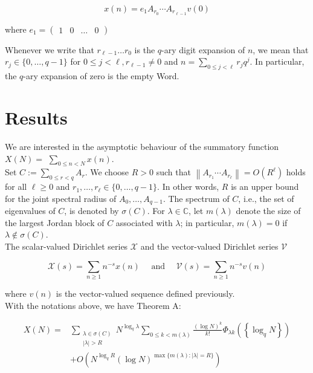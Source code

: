 $$
x(n)=e_{1} A_{r_{0}} \cdots A_{r_{\ell-1}} v(0)
$$

where $e_{1}=\left(\begin{array}{llll}1 & 0 & \ldots & 0\end{array}\right)$

Whenever we write that $r_{\ell-1} \ldots r_{0}$ is the $q$-ary digit expansion of $n$, we mean that $r_{j} \in\{0, \ldots, q-1\}$ for $0 \leq j<\ell, r_{\ell-1} \neq 0$ and $n=\sum_{0 \leq j<\ell} r_{j} q^{j}$. In particular, the $q$-ary expansion of zero is the empty Word.

\newpage
\section{Results}

We are interested in the asymptotic behaviour of the summatory function $X(N)=$ $\sum_{0 \leq n<N} x(n)$.
\\

Set $C:=\sum_{0 \leq r<q} A_{r}$. We choose $R>0$ such that $\left\|A_{r_{1}} \cdots A_{r_{\ell}}\right\|=O\left(R^{\ell}\right)$ holds for all $\ell \geq 0$ and $r_{1}, \ldots, r_{\ell} \in\{0, \ldots, q-1\}$. In other words, $R$ is an upper bound for the joint spectral radius of $A_{0}, \ldots, A_{q-1}$. The spectrum of $C$, i.e., the set of eigenvalues of $C$, is denoted by $\sigma(C)$. For $\lambda \in \mathbb{C}$, let $m(\lambda)$ denote the size of the largest Jordan block of $C$ associated with $\lambda$; in particular, $m(\lambda)=0$ if $\lambda \notin \sigma(C)$. 
\\

The scalar-valued Dirichlet series $\mathcal{X}$ and the vector-valued Dirichlet series $\mathcal{V}$ 

$$
\mathcal{X}(s)=\sum_{n \geq 1} n^{-s} x(n) \quad \text { and } \quad \mathcal{V}(s)=\sum_{n \geq 1} n^{-s} v(n)
$$

where $v(n)$ is the vector-valued sequence defined previously.
\\

With the notations above, we have Theorem A:

$$
\begin{aligned}
	X(N)= & \sum_{\substack{\lambda \in \sigma(C) \\
			|\lambda|>R}} N^{\log _{q} \lambda} \sum_{0 \leq k<m(\lambda)} \frac{(\log N)^{k}}{k !} \Phi_{\lambda k}\left(\left\{\log _{q} N\right\}\right) \\
	& +O\left(N^{\log _{q} R}(\log N)^{\max \{m(\lambda):|\lambda|=R\}}\right)
\end{aligned}
$$

